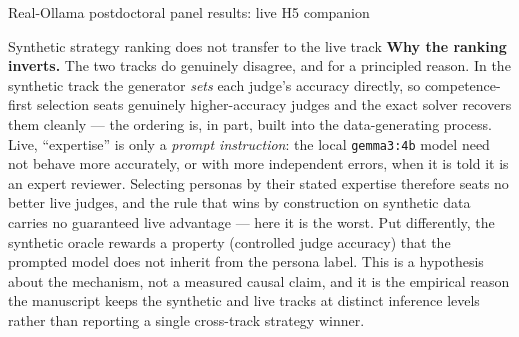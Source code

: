 \documentclass[
  ignorenonframetext,
]{beamer}
\begin{document}
\begin{frame}{Real-Ollama postdoctoral panel
results: live H5 companion}
\begin{block}{Synthetic strategy ranking does not transfer to the live
track}
\textbf{Why the ranking inverts.} The two tracks do genuinely disagree,
and for a principled reason. In the synthetic track the generator
\emph{sets} each judge's accuracy directly, so competence-first
selection seats genuinely higher-accuracy judges and the exact solver
recovers them cleanly --- the ordering is, in part, built into the
data-generating process. Live, ``expertise'' is only a \emph{prompt
instruction}: the local \texttt{gemma3:4b} model need not behave more
accurately, or with more independent errors, when it is told it is an
expert reviewer. Selecting personas by their stated expertise therefore
seats no better live judges, and the rule that wins by construction on
synthetic data carries no guaranteed live advantage --- here it is the
worst. Put differently, the synthetic oracle rewards a property
(controlled judge accuracy) that the prompted model does not inherit
from the persona label. This is a hypothesis about the mechanism, not a
measured causal claim, and it is the empirical reason the manuscript
keeps the synthetic and live tracks at distinct inference levels rather
than reporting a single cross-track strategy winner.
\end{block}
\end{frame}
\end{document}
